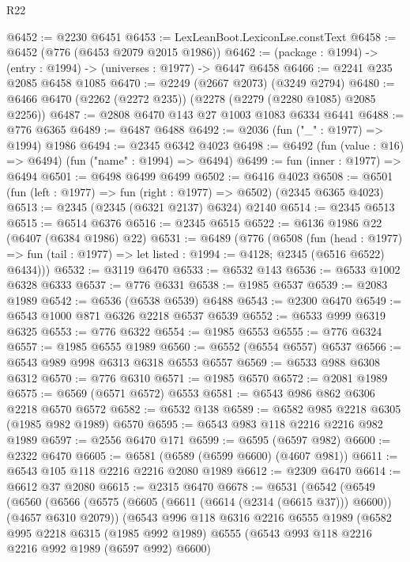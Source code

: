 \begin{lexlean}{R22}
\begin{coremodule}
@6452 := @2230 @6451
@6453 := LexLeanBoot.LexiconLse.constText
@6458 := @6452 (@776 (@6453 @2079 @2015 @1986))
@6462 := (package : @1994) -> (entry : @1994) -> (universes : @1977) -> @6447 @6458
@6466 := @2241 @235 @2085 @6458 @1085
@6470 := @2249 (@2667 @2073) (@3249 @2794)
@6480 := @6466 @6470 (@2262 (@2272 @235)) (@2278 (@2279 (@2280 @1085) @2085 @2256))
@6487 := @2808 @6470 @143 @27 @1003 @1083 @6334 @6441
@6488 := @776 @6365
@6489 := @6487 @6488
@6492 := @2036 (fun ("_" : @1977) => @1994) @1986
@6494 := @2345 @6342 @4023
@6498 := @6492 (fun (value : @16) => @6494) (fun ("name" : @1994) => @6494)
@6499 := fun (inner : @1977) => @6494
@6501 := @6498 @6499 @6499
@6502 := @6416 @4023
@6508 := @6501 (fun (left : @1977) => fun (right : @1977) => @6502) (@2345 @6365 @4023)
@6513 := @2345 (@2345 (@6321 @2137) @6324) @2140
@6514 := @2345 @6513
@6515 := @6514 @6376
@6516 := @2345 @6515
@6522 := @6136 @1986 @22 (@6407 (@6384 @1986) @22)
@6531 := @6489
    (@776
      (@6508
        (fun (head : @1977) =>
        fun (tail : @1977) => let listed : @1994 := @4128; @2345 (@6516 @6522) @6434)))
@6532 := @3119 @6470
@6533 := @6532 @143
@6536 := @6533 @1002 @6328 @6333
@6537 := @776 @6331
@6538 := @1985 @6537
@6539 := @2083 @1989
@6542 := @6536 (@6538 @6539) @6488
@6543 := @2300 @6470
@6549 := @6543 @1000 @871 @6326 @2218 @6537 @6539
@6552 := @6533 @999 @6319 @6325
@6553 := @776 @6322
@6554 := @1985 @6553
@6555 := @776 @6324
@6557 := @1985 @6555 @1989
@6560 := @6552 (@6554 @6557) @6537
@6566 := @6543 @989 @998 @6313 @6318 @6553 @6557
@6569 := @6533 @988 @6308 @6312
@6570 := @776 @6310
@6571 := @1985 @6570
@6572 := @2081 @1989
@6575 := @6569 (@6571 @6572) @6553
@6581 := @6543 @986 @862 @6306 @2218 @6570 @6572
@6582 := @6532 @138
@6589 := @6582 @985 @2218 @6305 (@1985 @982 @1989) @6570
@6595 := @6543 @983 @118 @2216 @2216 @982 @1989
@6597 := @2556 @6470 @171
@6599 := @6595 (@6597 @982)
@6600 := @2322 @6470
@6605 := @6581 (@6589 (@6599 @6600) (@4607 @981))
@6611 := @6543 @105 @118 @2216 @2216 @2080 @1989
@6612 := @2309 @6470
@6614 := @6612 @37 @2080
@6615 := @2315 @6470
@6678 := @6531
    (@6542
      (@6549
        (@6560
          (@6566
            (@6575 (@6605 (@6611 (@6614 (@2314 (@6615 @37))) @6600)) (@4657 @6310 @2079))
            (@6543
              @996
              @118
              @6316
              @2216
              @6555
              @1989
              (@6582
                @995
                @2218
                @6315
                (@1985 @992 @1989)
                @6555
                (@6543 @993 @118 @2216 @2216 @992 @1989 (@6597 @992) @6600)

\end{coremodule}
\end{lexlean}
